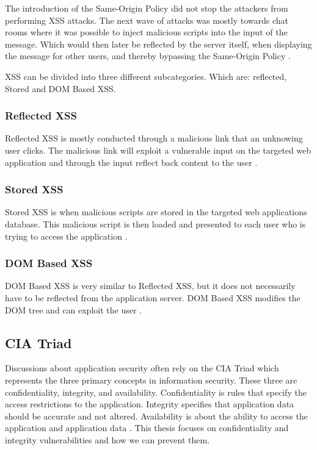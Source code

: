 The introduction of the Same-Origin Policy did not stop the attackers from performing XSS attacks. The next wave of attacks was mostly towards chat rooms where it was possible to inject malicious scripts into the input of the message. Which would then later be reflected by the server itself, when displaying the message for other users, and thereby bypassing the Same-Origin Policy \parencite{FogieSeth2007Xacs}.

XSS can be divided into three different subcategories. Which are: reflected, Stored and DOM Based XSS.

\subsubsection{Reflected XSS}
Reflected XSS is mostly conducted through a malicious link that an unknowing user clicks. The malicious link will exploit a vulnerable input on the targeted web application and through the input reflect back content to the user \parencite{Secure_Web}.


\subsubsection{Stored XSS}
Stored XSS is when malicious scripts are stored in the targeted web applications database. This malicious script is then loaded and presented to each user who is trying to access the application \parencite{Secure_Web}.


\subsubsection{DOM Based XSS}
DOM Based XSS is very similar to Reflected XSS, but it does not necessarily have to be reflected from the application server. DOM Based XSS modifies the DOM tree and can exploit the user \parencite{Secure_Web}.


\subsection{CIA Triad}
Discussions about application security often rely on the CIA Triad which represents the three primary concepts in information security. These three are confidentiality, integrity, and availability. Confidentiality is rules that specify the access restrictions to the application. Integrity specifies that application data should be accurate and not altered. Availability is about the ability to access the application and application data \parencite{2014C1-W}. This thesis focuses on confidentiality and integrity vulnerabilities and how we can prevent them.

